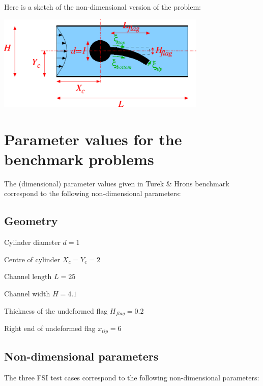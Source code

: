 Here is a sketch of the non-\/dimensional version of the problem\+:

 
\begin{DoxyImage}
\includegraphics[width=0.75\textwidth]{turek_flag}
\end{DoxyImage}




 

\hypertarget{index_parameters}{}\section{Parameter values for the benchmark problems}\label{index_parameters}
The (dimensional) parameter values given in Turek \& Hron\textquotesingle{}s benchmark correspond to the following non-\/dimensional parameters\+:\hypertarget{index_geom}{}\subsection{Geometry}\label{index_geom}

\begin{DoxyItemize}
\item Cylinder diameter $ d = 1 $
\item Centre of cylinder $ X_c = Y_c = 2 $
\item Channel length $ L= 25 $
\item Channel width $ H = 4.1 $
\item Thickness of the undeformed flag $ H_{flag} = 0.2 $
\item Right end of undeformed flag $ x_{tip} = 6 $
\end{DoxyItemize}\hypertarget{index_nd_params}{}\subsection{Non-\/dimensional parameters}\label{index_nd_params}
The three F\+SI test cases correspond to the following non-\/dimensional parameters\+:

